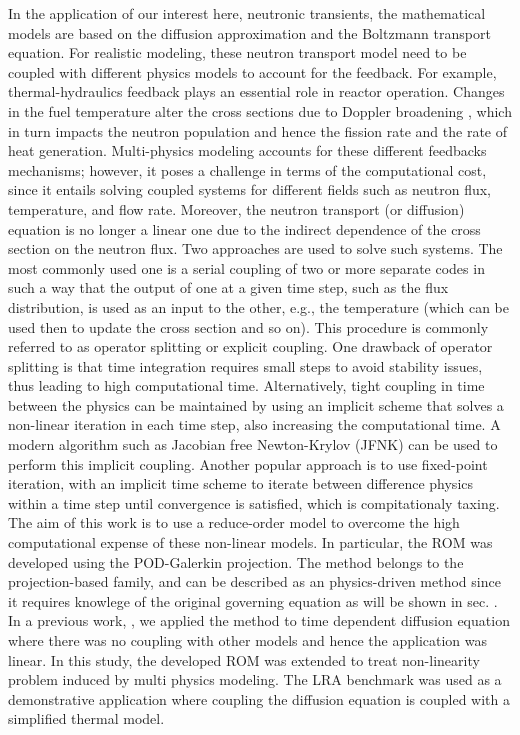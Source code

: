 \documentclass[]{interact}
\theoremstyle{plain}%
\theoremstyle{definition}
\theoremstyle{remark}
\begin{document}
In the application of our interest here, neutronic transients, the mathematical models are based on the diffusion approximation and the Boltzmann transport equation.
For realistic modeling, these neutron transport model need to be coupled with different physics models to account for the feedback.
For example, thermal-hydraulics feedback plays an essential role in reactor operation.
Changes in the fuel temperature alter the cross sections due to Doppler broadening \cite{stacey2018nuclear}, which in turn impacts the neutron population and hence the fission rate and the rate of heat generation.
Multi-physics modeling accounts for these different feedbacks mechanisms; however, it poses a challenge in terms of the computational cost,
since it entails solving coupled systems for different fields such as neutron flux, temperature, and flow rate.
Moreover, the neutron transport (or diffusion) equation is no longer a linear one due to the indirect dependence of the cross section on the neutron flux.
Two approaches are used to solve such systems.
The most commonly used one is a serial coupling of two or more separate codes in such a way that the output of one at a given time step, such as the flux distribution, is used as an input to the other, e.g., the temperature (which can be used then to update the cross section and so on).
This procedure is commonly referred to as operator splitting or explicit coupling.
One drawback of operator splitting is that time integration requires small steps to avoid stability issues, thus leading to high computational time. 
Alternatively, tight coupling in time between the physics can be maintained by using an implicit scheme that solves a non-linear iteration in each time step, also increasing the computational time.
A modern algorithm such as Jacobian free Newton-Krylov (JFNK) \cite{gaston2009parallel} can be used to perform this implicit coupling.
Another popular approach is to use fixed-point iteration, with an implicit time scheme to iterate between difference physics within a time step until convergence is satisfied, which is compitationaly taxing.
The aim of this work is to use a reduce-order model to overcome the high computational expense of these non-linear models.
In particular, the ROM was developed using the POD-Galerkin projection.
The method belongs to the projection-based family, and can be described as an physics-driven method since it requires knowlege of the original governing equation as will be shown in sec.  .
In a previous work, \cite{elzohery-greedyPOD}, we applied the method to time dependent diffusion equation where there was no coupling with other models and hence the application was linear.
In this study, the developed ROM was extended to treat non-linearity problem induced by multi physics modeling.
The LRA benchmark was used as a demonstrative application where coupling the diffusion equation is coupled with a simplified thermal model.
\end{document}

